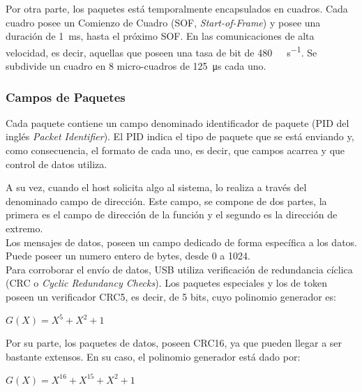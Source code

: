 	Por otra parte, los paquetes está temporalmente encapsulados en cuadros. Cada cuadro posee un Comienzo de Cuadro (SOF, {\it Start-of-Frame}) y posee una duración de \SI{1}{\milli\second}, hasta el próximo SOF. En las comunicaciones de alta velocidad, es decir, aquellas que poseen una tasa de bit de \SI{480}{\mega\bit\per\second}. Se subdivide un cuadro en 8 micro-cuadros de \SI{125}{\micro\second} cada uno.\\
	
	\subsubsection*{Campos de Paquetes}
	Cada paquete contiene un campo denominado identificador de paquete (PID del inglés {\it Packet Identifier}). El PID indica el tipo de paquete que se está enviando y, como consecuencia, el formato de cada uno, es decir, que campos acarrea y que control de datos utiliza.
	
	A su vez, cuando el host solicita algo al sistema, lo realiza a través del denominado campo de dirección. Este campo, se compone de dos partes, la primera es el campo de dirección de la función y el segundo es la dirección de extremo.\\
	
	Los mensajes de datos, poseen un campo dedicado de forma específica a los datos. Puede poseer un numero entero de bytes, desde \SI{0}{} a \SI{1024}{}.\\
	
	Para corroborar el envío de datos, USB utiliza verificación de redundancia cíclica (CRC o {\it Cyclic Redundancy Checks}). Los paquetes especiales y los de token poseen un verificador  CRC5, es decir, de 5 bits, cuyo polinomio generador es:

	\begin{center}
		\begin{math}
			G(X) = X^5 + X^2 + 1
		\end{math}
	\end{center}	
	
	Por su parte, los paquetes de datos, poseen CRC16, ya que pueden llegar a ser bastante extensos. En su caso, el polinomio generador está dado por:
	
	\begin{center}
		\begin{math}
			G(X) = X^{16} + X^{15} + X^2 + 1
		\end{math}
	\end{center}

